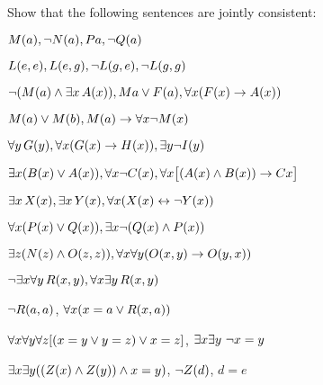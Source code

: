 \problempart
Show that the following sentences are jointly consistent:
\begin{earg}
\item $\mathord{M}(a), \neg \mathord{N}(a), Pa, \neg \mathord{Q}(a)$
\item $\mathord{L}(e,e), \mathord{L}(e,g), \neg \mathord{L}(g,e), \neg \mathord{L}(g,g)$
\item $\neg (\mathord{M}(a) \wedge \exists x\,\mathord{A}(x)), Ma \vee \mathord{F}(a), \forall x(\mathord{F}(x) \rightarrow \mathord{A}(x))$
\item $\mathord{M}(a) \vee \mathord{M}(b), \mathord{M}(a) \rightarrow \forall x \neg \mathord{M}(x)$
\item $\forall y\,\mathord{G}(y), \forall x (\mathord{G}(x) \rightarrow \mathord{H}(x)), \exists y \neg \mathord{I}(y)$
\item $\exists x(\mathord{B}(x) \vee \mathord{A}(x)), \forall x \neg \mathord{C}(x), \forall x\bigl[(\mathord{A}(x) \wedge \mathord{B}(x)) \rightarrow Cx\bigr]$
\item $\exists x\,\mathord{X}(x), \exists x\,\mathord{Y}(x), \forall x(\mathord{X}(x) \leftrightarrow \neg \mathord{Y}(x))$
\item $\forall x(\mathord{P}(x) \vee \mathord{Q}(x)), \exists x\neg(\mathord{Q}(x) \wedge \mathord{P}(x))$
\item $\exists z(\mathord{N}(z) \wedge \mathord{O}(z,z)), \forall x\forall y(\mathord{O}(x,y) \rightarrow \mathord{O}(y,x))$
\item $\neg \exists x \forall y\,\mathord{R}(x,y), \forall x \exists y\,\mathord{R}(x,y)$
\item $\neg \mathord{R}(a,a)$, $\forall x (x=a \vee \mathord{R}(x,a))$
\item $\forall x\forall y\forall z[(x=y \vee y=z )\vee x=z]$, $\exists x\exists y\ \neg x= y$
\item $\exists x\exists y((\mathord{Z}(x) \wedge \mathord{Z}(y) )\wedge x=y)$, $\neg \mathord{Z}(d)$, $d=e$
\end{earg}

